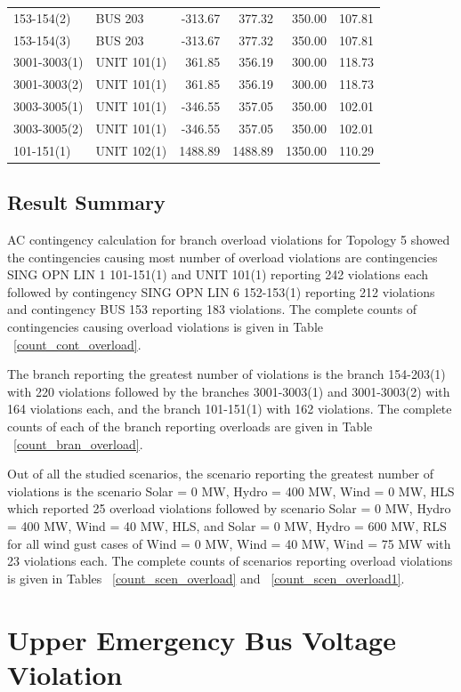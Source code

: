 \documentclass[10pt]{report}
\begin{document}
\begin{table}[H]
{\begin{tabular}{llrrrr}
153-154(2) & BUS 203 & -313.67 & 377.32 & 350.00 & 107.81 \\
153-154(3) & BUS 203 & -313.67 & 377.32 & 350.00 & 107.81 \\
3001-3003(1) & UNIT 101(1) & 361.85 & 356.19 & 300.00 & 118.73 \\
3001-3003(2) & UNIT 101(1) & 361.85 & 356.19 & 300.00 & 118.73 \\
3003-3005(1) & UNIT 101(1) & -346.55 & 357.05 & 350.00 & 102.01 \\
3003-3005(2) & UNIT 101(1) & -346.55 & 357.05 & 350.00 & 102.01 \\
101-151(1) & UNIT 102(1) & 1488.89 & 1488.89 & 1350.00 & 110.29 \\
\bottomrule
\end{tabular}}
\end{table}



\section{Result Summary}
AC contingency calculation for branch overload violations for Topology 5 showed the contingencies causing most number of overload violations are contingencies SING OPN LIN 1 101-151(1) and UNIT 101(1) reporting 242 violations each followed by contingency SING OPN LIN 6 152-153(1) reporting 212 violations and contingency BUS 153 reporting 183 violations. The complete counts of contingencies causing overload violations is given in Table ~\ref {count_cont_overload}. 

The branch reporting the greatest number of violations is the branch 154-203(1) with 220 violations followed by the branches 3001-3003(1) and 3001-3003(2) with 164 violations each, and the branch 101-151(1) with 162 violations. The complete counts of each of the branch reporting overloads are given in Table ~\ref{count_bran_overload}.

Out of all the studied scenarios, the scenario reporting the greatest number of violations is the scenario Solar = 0 MW, Hydro = 400 MW, Wind = 0 MW, HLS which reported 25 overload violations followed by scenario Solar = 0 MW, Hydro = 400 MW, Wind = 40 MW, HLS, and Solar = 0 MW, Hydro = 600 MW, RLS for all wind gust cases of  Wind = 0 MW, Wind = 40 MW, Wind = 75 MW with 23 violations each. The complete counts of scenarios reporting overload violations is given in Tables ~\ref {count_scen_overload} and ~\ref {count_scen_overload1}.  


\chapter{Upper Emergency Bus Voltage Violation}
\label{upper}
\end{document}
